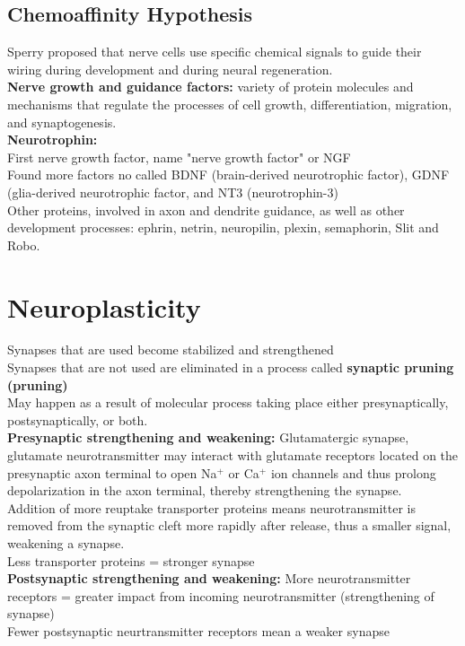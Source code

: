 \documentclass{article}
\begin{document}
\subsection{Chemoaffinity Hypothesis}
Sperry proposed that nerve cells use specific chemical signals to guide their wiring during development and during neural regeneration. \\
\textbf{Nerve growth and guidance factors:} variety of protein molecules and mechanisms that regulate the processes of cell growth, differentiation, migration, and synaptogenesis. \\
\textbf{Neurotrophin:} \\
\indent First nerve growth factor, name "nerve growth factor" or NGF \\
\indent Found more factors no called BDNF (brain-derived neurotrophic factor), GDNF (glia-derived neurotrophic factor, and NT3 (neurotrophin-3) \\
Other proteins, involved in axon and dendrite guidance, as well as other development processes: ephrin, netrin, neuropilin, plexin, semaphorin, Slit and Robo. 
\section{Neuroplasticity}
Synapses that are used become stabilized and strengthened \\
Synapses that are not used are eliminated in a process called \textbf{synaptic pruning (pruning)} \\
May happen as a result of molecular process taking place either presynaptically, postsynaptically, or both. \\
\textbf{Presynaptic strengthening and weakening:}
Glutamatergic synapse, glutamate neurotransmitter may interact with glutamate receptors located on the presynaptic axon terminal to open Na$^+$ or Ca$^+$ ion channels and thus prolong depolarization in the axon terminal, thereby strengthening the synapse. \\
Addition of more reuptake transporter proteins means neurotransmitter is removed from the synaptic cleft more rapidly after release, thus a smaller signal, weakening a synapse. \\
Less transporter proteins = stronger synapse \\
\textbf{Postsynaptic strengthening and weakening:} 
More neurotransmitter receptors = greater impact from incoming neurotransmitter (strengthening of synapse) \\
Fewer postsynaptic neurtransmitter receptors mean a weaker synapse \\
\end{document}
